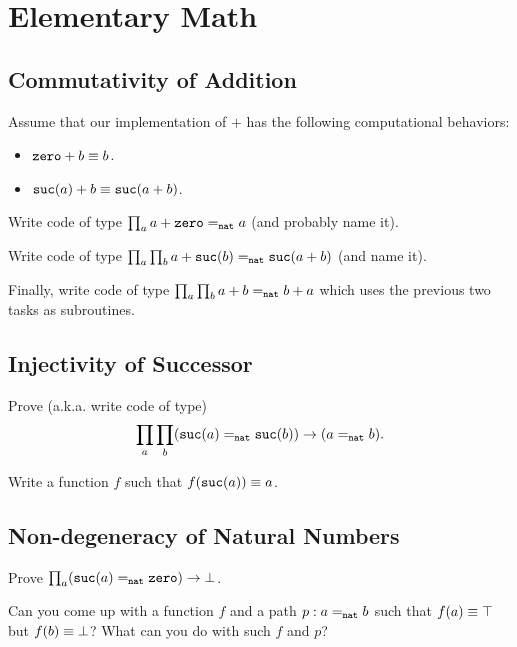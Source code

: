 \documentclass[12pt]{article}
\begin{document}
\section{Elementary Math}

\subsection{Commutativity of Addition}

Assume that our implementation of $+$ has the following computational behaviors:
\begin{itemize}
  \item $\mathtt{zero} + b \equiv b$.
  \item $\mathtt{suc}(a) + b \equiv \mathtt{suc}(a + b)$.
\end{itemize}

\begin{task}
  Write code of type $\prod_a a + \mathtt{zero} =_{\mathtt{nat}} a$ (and probably name it).
\end{task}
\begin{task}
  Write code of type $\prod_a \prod_b a + \mathtt{suc}(b) =_{\mathtt{nat}} \mathtt{suc}(a + b)$ (and name it).
\end{task}
\begin{task}
  Finally, write code of type $\prod_a \prod_b a + b =_{\mathtt{nat}} b + a$
  which uses the previous two tasks as subroutines.
\end{task}

\subsection{Injectivity of Successor}

\begin{task}
  Prove (a.k.a. write code of type)
  \[
    \prod_a \prod_b (\mathtt{suc}(a) =_{\mathtt{nat}} \mathtt{suc}(b)) \to (a =_{\mathtt{nat}} b).
  \]
  \begin{hint}
    Write a function $f$ such that $f(\mathtt{suc}(a)) \equiv a$.
  \end{hint}
\end{task}

\subsection{Non-degeneracy of Natural Numbers}

\begin{task}
  Prove $\prod_a (\mathtt{suc}(a) =_{\mathtt{nat}} \mathtt{zero}) \to \bot$.
  \begin{hint}
    Can you come up with a function $f$ and a path $p : a =_{\mathtt{nat}} b$ such that
    $f(a) \equiv \top$ but $f(b) \equiv \bot$?
    What can you do with such $f$ and $p$?
  \end{hint}
\end{task}
\end{document}
